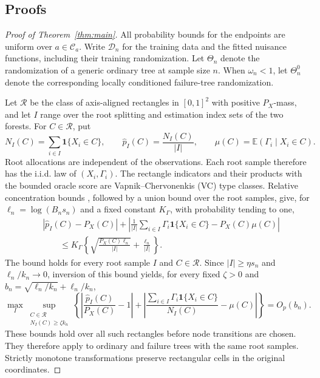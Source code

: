 \documentclass[12pt]{article}
\newcommand{\E}{\mathbb E}
\newcommand{\one}{\mathbf 1}
\begin{document}
\clearpage
\begin{appendix}

\section{Proofs}\label{app:proofs}

\begin{proof}[Proof of Theorem~\ref{thm:main}]
All probability bounds for the endpoints are uniform over \(a\in\mathcal C_a\). Write \(\mathcal D_n\) for the training data and the fitted nuisance functions, including their training randomization. Let \(\Theta_n\) denote the randomization of a generic ordinary tree at sample size \(n\). When \(\omega_n<1\), let \(\Theta_n^0\) denote the corresponding locally conditioned failure-tree randomization.

Let \(\mathcal R\) be the class of axis-aligned rectangles in \([0,1]^2\) with positive \(P_X\)-mass, and let \(I\) range over the root splitting and estimation index sets of the two forests. For \(C\in\mathcal R\), put
\[
N_I(C)=\sum_{i\in I}\one\{X_i\in C\},\qquad
\widehat p_I(C)=\frac{N_I(C)}{|I|},\qquad
\mu(C)=\E(\Gamma_i\mid X_i\in C).
\]
Root allocations are independent of the observations. Each root sample therefore has the i.i.d. law of \((X_i,\Gamma_i)\). The rectangle indicators and their products with the bounded oracle score are Vapnik--Chervonenkis (VC) type classes. Relative concentration bounds \citep[Sections 2 and 3]{gine2006ratio}, followed by a union bound over the root samples, give, for \(\ell_n=\log(B_ns_n)\) and a fixed constant \(K_\Gamma\), with probability tending to one,
\[
\begin{aligned}
&\left|\widehat p_I(C)-P_X(C)\right|
+\left|\frac1{|I|}\sum_{i\in I}\Gamma_i\one\{X_i\in C\}
-P_X(C)\mu(C)\right|\\
&\hspace{2em}\le K_\Gamma\left\{
\sqrt{\frac{P_X(C)\ell_n}{|I|}}+\frac{\ell_n}{|I|}\right\}.
\end{aligned}
\]
The bound holds for every root sample \(I\) and \(C\in\mathcal R\). Since \(|I|\ge\eta s_n\) and \(\ell_n/k_n\to0\), inversion of this bound yields, for every fixed \(\zeta>0\) and \(b_n=\sqrt{\ell_n/k_n}+\ell_n/k_n\),
\begin{equation}\label{eq:proof-relative}
\max_I\sup_{\substack{C\in\mathcal R\\N_I(C)\ge\zeta k_n}}
\left\{
\left|\frac{\widehat p_I(C)}{P_X(C)}-1\right|
+\left|\frac{\sum_{i\in I}\Gamma_i\one\{X_i\in C\}}{N_I(C)}
-\mu(C)\right|\right\}=O_p(b_n).
\end{equation}
These bounds hold over all such rectangles before node transitions are chosen. They therefore apply to ordinary and failure trees with the same root samples. Strictly monotone transformations preserve rectangular cells in the original coordinates.


\end{proof}
\end{appendix}
\end{document}
